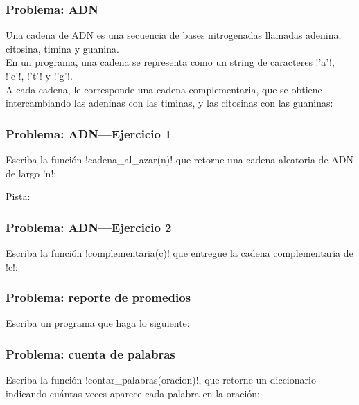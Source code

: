 \documentclass[12pt]{beamer}
\begin{document}
  \begin{frame}
    \label{problema-adn-enunciado}
    \frametitle{Problema: ADN}
    Una cadena de ADN es una secuencia
    de bases nitrogenadas llamadas
    adenina, citosina, timina y guanina. \\[2ex]

    En un programa,
    una cadena se representa como un string
    de caracteres \li!'a'!, \li!'c'!, \li!'t'! y \li!'g'!. \\[2ex]

    A cada cadena,
    le corresponde una cadena complementaria,
    que se obtiene intercambiando las adeninas con las timinas,
    y las citosinas con las guaninas:

    
  \end{frame}

  \begin{frame}
    \label{problema-adn-aleatorio}
    \frametitle{Problema: ADN---Ejercicio 1}
    Escriba la función \li!cadena_al_azar(n)!
    que retorne una cadena aleatoria de ADN
    de largo \li!n!:
    

    Pista:
    
  \end{frame}

  \begin{frame}
    \label{problema-adn-complementaria}
    \frametitle{Problema: ADN---Ejercicio 2}
    Escriba la función \li!complementaria(c)!
    que entregue la cadena complementaria de \li!c!:
    
  \end{frame}

  \begin{frame}
    \label{problema-reporte-promedios}
    \frametitle{Problema: reporte de promedios}
    Escriba un programa que haga lo siguiente:
    
  \end{frame}

  \begin{frame}
    \label{problema-cuenta-palabras}
    \frametitle{Problema: cuenta de palabras}
    Escriba la función \li!contar_palabras(oracion)!,
    que retorne un diccionario indicando cuántas veces
    aparece cada palabra en la oración:
    \footnotesize
    
  \end{frame}
\end{document}
